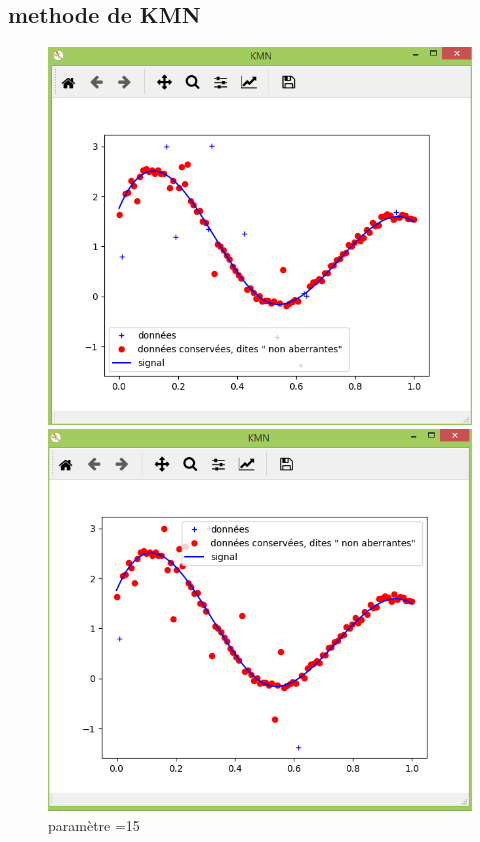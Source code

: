 \documentclass[11pt]{report}
\begin{document}
\subsection*{methode de KMN}
 \begin{figure}[!htb] %
\includegraphics[width=\linewidth]{kmnn.PNG} %
\caption{paramètre =15} %
\label{m15} %
\endminipage
{}%
\includegraphics[width=\linewidth]{kmn5.PNG}  

\end{figure}
\end{document}

